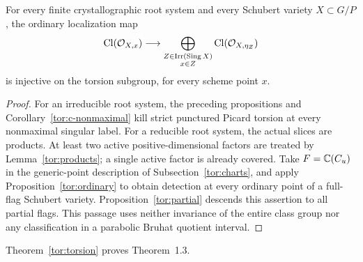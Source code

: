 \begin{theorem}\label{tor:torsion}
For every finite crystallographic root system and every Schubert variety $X\subset G/P$, the ordinary localization map
\[
 \operatorname{Cl}(\mathcal O_{X,x})\longrightarrow
 \bigoplus_{\substack{Z\in\operatorname{Irr}(\operatorname{Sing} X)\\x\in Z}}
 \operatorname{Cl}(\mathcal O_{X,\eta_Z})
\]
is injective on the torsion subgroup, for every scheme point $x$.
\end{theorem}
\begin{proof}
For an irreducible root system, the preceding propositions and Corollary~\ref{tor:c-nonmaximal} kill strict punctured Picard torsion at every nonmaximal singular label. For a reducible root system, the actual slices are products. At least two active positive-dimensional factors are treated by Lemma~\ref{tor:products}; a single active factor is already covered. Take $F=\mathbb C(C_u)$ in the generic-point description of Subsection~\ref{tor:charts}, and apply Proposition~\ref{tor:ordinary} to obtain detection at every ordinary point of a full-flag Schubert variety. Proposition~\ref{tor:partial} descends this assertion to all partial flags. This passage uses neither invariance of the entire class group nor any classification in a parabolic Bruhat quotient interval.
\end{proof}

Theorem~\ref{tor:torsion} proves Theorem~1.3.

